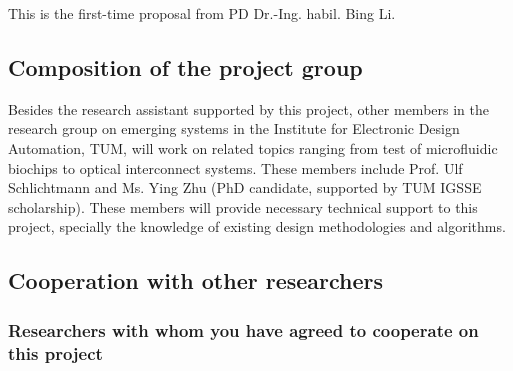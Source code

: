 This is the first-time proposal from PD Dr.-Ing. habil. Bing Li.
\vskip 12pt

\subsection{Composition of the project group}

Besides the research assistant supported by this project, other members in
the research group on emerging systems in the Institute for Electronic Design
Automation, TUM, will work on related topics ranging from test of microfluidic
biochips to optical interconnect systems. These members include Prof. Ulf
Schlichtmann and
Ms. Ying
Zhu (PhD candidate, supported by TUM IGSSE scholarship). These members will provide necessary
technical support to this project, 
specially the knowledge of existing design methodologies
and algorithms.  


\subsection{Cooperation with other researchers}
\subsubsection{Researchers with whom you have agreed to cooperate on this
project}

